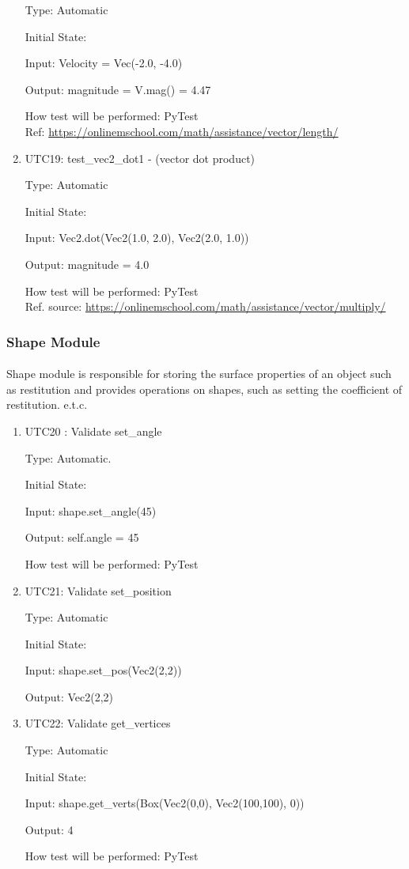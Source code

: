 \documentclass[12pt, titlepage]{article}
\begin{document}
\begin{enumerate}
	Type: Automatic
	
	Initial State: 
	
	Input: Velocity = Vec(-2.0, -4.0)
	
	Output: magnitude = V.mag() = 4.47
	
	How test will be performed: PyTest\\
	Ref: \url{https://onlinemschool.com/math/assistance/vector/length/}
	\item{UTC19}{: test\_vec2\_dot1 - (vector dot product)\\}
	
	Type: Automatic
	
	Initial State: 
	
	Input: Vec2.dot(Vec2(1.0, 2.0), Vec2(2.0, 1.0))
	
	Output: magnitude = 4.0
	
	How test will be performed: PyTest\\
	Ref. source: \url{https://onlinemschool.com/math/assistance/vector/multiply/}
	
	
\end{enumerate}

\subsubsection{Shape Module}

\paragraph{}
Shape module is responsible for storing the surface properties of an object such as restitution and provides operations on shapes, such as setting the coefficient of restitution. e.t.c.
\begin{enumerate}
	
	
	\item{UTC20} {: Validate set\_angle \\}
	
	Type: Automatic.
	
	Initial State: 
	
	Input: shape.set\_angle(45)
	
	Output: self.angle = 45
	
	How test will be performed: PyTest 
	
	\item{UTC21}{: Validate set\_position\\}
	
	Type: Automatic
	
	Initial State: 
	
	Input: shape.set\_pos(Vec2(2,2))
	
	Output: Vec2(2,2)
	
	\item{UTC22}{: Validate get\_vertices\\}
	
	Type: Automatic
	
	Initial State: 
	
	Input: shape.get\_verts(Box(Vec2(0,0), Vec2(100,100), 0)) 
	
	Output: 4
	
	How test will be performed: PyTest
	

\end{enumerate}
\end{document}
